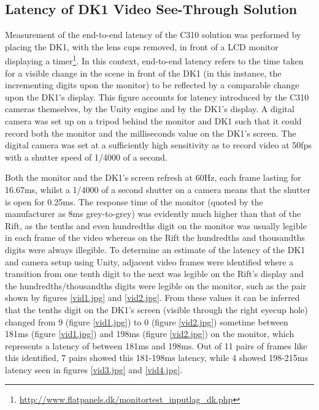 
\subsection{Latency of DK1 Video See-Through Solution}

Measurement of the end-to-end latency of the C310 solution was performed by placing the DK1, with the lens cups removed, in front of a LCD monitor displaying a timer\footnote{\url{http://www.flatpanels.dk/monitortest_inputlag_dk.php}}. In this context, end-to-end latency refers to the time taken for a visible change in the scene in front of the DK1 (in this instance, the incrementing digits upon the monitor) to be reflected by a comparable change upon the DK1's display. This figure accounts for latency introduced by the C310 cameras themselves, by the Unity engine and by the DK1's display. A digital camera was set up on a tripod behind the monitor and DK1 such that it could record both the monitor and the milliseconds value on the DK1's screen. The digital camera was set at a sufficiently high sensitivity as to record video at 50fps with a shutter speed of 1/4000 of a second.

Both the monitor and the DK1's screen refresh at 60Hz, each frame lasting for 16.67ms, whilst a 1/4000 of a second shutter on a camera means that the shutter is open for 0.25ms. The response time of the monitor (quoted by the manufacturer as 8ms grey-to-grey) was evidently much higher than that of the Rift, as the tenths and even hundredths digit on the monitor was usually legible in each frame of the video whereas on the Rift the hundredths and thousandths digits were always illegible. To determine an estimate of the latency of the DK1 and camera setup using Unity, adjacent video frames were identified where a transition from one tenth digit to the next was legible on the Rift's display and the hundredths/thousandths digits were legible on the monitor, such as the pair shown by figures \ref{vid1.jpg} and \ref{vid2.jpg}. From these values it can be inferred that the tenths digit on the DK1's screen (visible through the right eyecup hole) changed from 9 (figure \ref{vid1.jpg}) to 0 (figure \ref{vid2.jpg}) sometime between 181ms (figure \ref{vid1.jpg}) and 198ms (figure \ref{vid2.jpg}) on the monitor, which represents a latency of between 181ms and 198ms. Out of 11 pairs of frames like this identified, 7 pairs showed this 181-198ms latency, while 4 showed 198-215ms latency seen in figures \ref{vid3.jpg} and \ref{vid4.jpg}.

